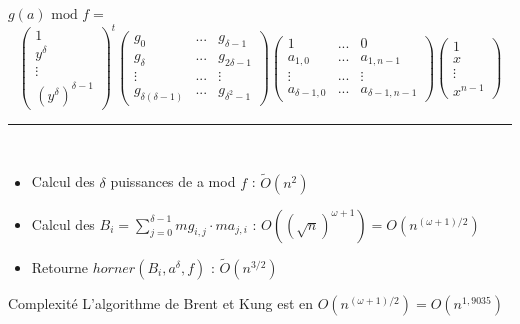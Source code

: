 \documentclass[10pt,a4paper]{beamer}
\begin{document}
\begin{frame}
    $g(a)\text{ mod }f =$ 
    \[
    \begin{pmatrix}
        1 \\
        y^\delta \\
        \vdots \\
        (y^\delta)^{\delta-1} 
    \end{pmatrix}^t
    \begin{pmatrix}
        g_0 & ... & g_{\delta-1} \\
        g_{\delta} & ... & g_{2\delta-1} \\
        \vdots & ... & \vdots \\
        g_{\delta(\delta-1)} & ... & g_{\delta^2-1}
    \end{pmatrix}
    \begin{pmatrix}
        1 &  ... & 0 \\
        a_{1,0} & ... & a_{1,n-1} \\
        \vdots &  ... & \vdots \\
        a_{\delta-1,0} & ... & a_{\delta-1,n-1}
    \end{pmatrix}
    \begin{pmatrix}
        1 \\
        x \\
        \vdots \\
        x^{n-1}
    \end{pmatrix}
    \]
    \rule{\linewidth}{0.2mm}\\[0.5cm]
    
    \begin{itemize}
        \item Calcul des $\delta$ puissances de a mod $f$ : $\tilde{O}(n^2)$
        \item Calcul des $B_i = \sum_{j=0}^{\delta-1} mg_{i,j}\cdot ma_{j,i}$ : $O((\sqrt{n})^{\omega+1}) = O(n^{(\omega+1)/2})$
        \item Retourne $horner(B_i, a^{\delta}, f)$ : $\tilde{O}(n^{3/2})$
    \end{itemize}
    \begin{alertblock}{Complexité}
        L'algorithme de Brent et Kung est en $O(n^{(\omega+1)/2})=O(n^{1,9035})$
    \end{alertblock}
\end{frame}
\end{document}
